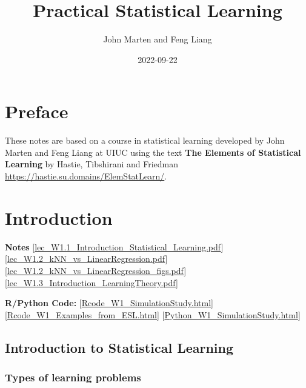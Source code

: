 \documentclass[
]{book}
\title{Practical Statistical Learning}
\author{John Marten and Feng Liang}
\date{2022-09-22}
\begin{document}
\maketitle

{
\setcounter{tocdepth}{1}
\tableofcontents
}
\hypertarget{preface}{%
\chapter*{Preface}\label{preface}}

These notes are based on a course in statistical learning developed by John Marten and Feng Liang at UIUC using the text \textbf{The Elements of Statistical Learning} by Hastie, Tibshirani and Friedman \url{https://hastie.su.domains/ElemStatLearn/}.

\hypertarget{introduction}{%
\chapter{Introduction}\label{introduction}}

\textbf{Notes}
{[}\href{https://liangfgithub.github.io/Notes/lec_W1.1_Introduction_Statistical_Learning.pdf}{lec\_W1.1\_Introduction\_Statistical\_Learning.pdf}{]}
{[}\href{https://liangfgithub.github.io/Notes/lec_W1.2_kNN_vs_LinearRegression.pdf}{lec\_W1.2\_kNN\_vs\_LinearRegression.pdf}{]}
{[}\href{https://liangfgithub.github.io/Notes/lec_W1.2_kNN_vs_LinearRegression_figs.pdf}{lec\_W1.2\_kNN\_vs\_LinearRegression\_figs.pdf}{]}
{[}\href{https://liangfgithub.github.io/Notes/lec_W1.3_Introduction_LearningTheory.pdf}{lec\_W1.3\_Introduction\_LearningTheory.pdf}{]}

\textbf{R/Python Code:}
{[}\href{https://liangfgithub.github.io/Rcode_W1_SimulationStudy.html}{Rcode\_W1\_SimulationStudy.html}{]}
{[}\href{https://liangfgithub.github.io/Rcode_W1_Examples_from_ESL.html}{Rcode\_W1\_Examples\_from\_ESL.html}{]}
{[}\href{https://liangfgithub.github.io/Python_W1_SimulationStudy.html}{Python\_W1\_SimulationStudy.html}{]}

\hypertarget{introduction-to-statistical-learning}{%
\section{Introduction to Statistical Learning}\label{introduction-to-statistical-learning}}

\hypertarget{types-of-learning-problems}{%
\subsection{Types of learning problems}\label{types-of-learning-problems}}
\end{document}

